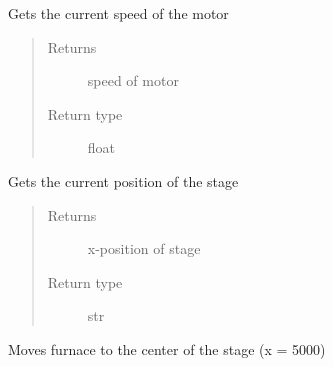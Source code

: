 \documentclass[letterpaper,10pt,english]{sphinxmanual}
\begin{document}
\begin{fulllineitems}

\begin{fulllineitems}
\label{\detokenize{drivers:drivers.Motor.get_speed}}
Gets the current speed of the motor
\begin{quote}\begin{description}
\item[{Returns}] \leavevmode
speed of motor

\item[{Return type}] \leavevmode
float

\end{description}\end{quote}

\end{fulllineitems}


\begin{fulllineitems}
\label{\detokenize{drivers:drivers.Motor.get_xpos}}
Gets the current position of the stage
\begin{quote}\begin{description}
\item[{Returns}] \leavevmode
x-position of stage

\item[{Return type}] \leavevmode
str

\end{description}\end{quote}

\end{fulllineitems}


\begin{fulllineitems}
\label{\detokenize{drivers:drivers.Motor.home}}
Moves furnace to the center of the stage (x = 5000)

\end{fulllineitems}



\end{fulllineitems}
\end{document}
